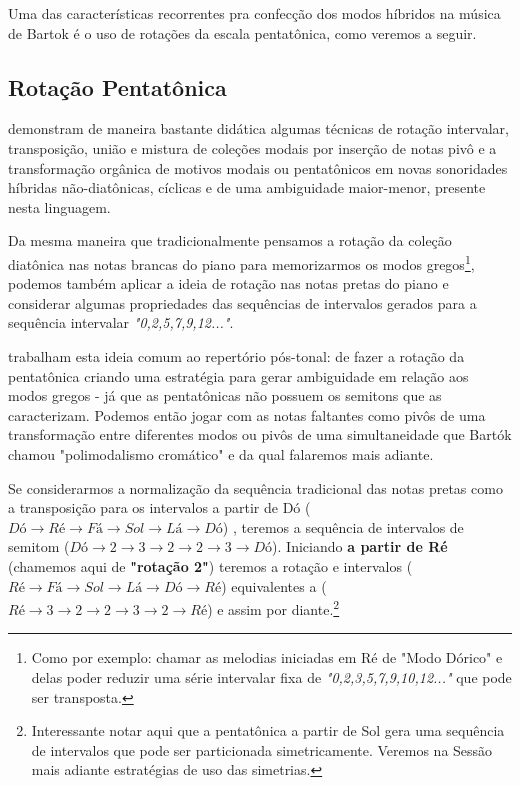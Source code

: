 \documentclass[
	12pt,				%
	openright,			%
	twoside,			%
	a4paper,			%
	english,			%
	french,				%
	spanish,			%
	brazil				%
	]{abntex2}
\begin{document}
Uma das características recorrentes pra confecção dos modos híbridos na música de Bartok é o uso de rotações da escala pentatônica, como veremos a seguir.


\subsection{Rotação Pentatônica}
\label{pentarota}
 
 demonstram de maneira bastante didática algumas técnicas de rotação intervalar, transposição, união e mistura de coleções modais por inserção de notas pivô e a transformação orgânica de motivos modais ou pentatônicos em novas sonoridades híbridas não-diatônicas, cíclicas e de uma ambiguidade maior-menor, presente nesta linguagem. 

Da mesma maneira que tradicionalmente pensamos a rotação da coleção diatônica nas notas brancas do piano para memorizarmos os modos gregos\footnote{Como por exemplo: chamar as melodias iniciadas em Ré de "Modo Dórico" e delas poder reduzir uma série intervalar fixa de \textit{"0,2,3,5,7,9,10,12..."} que pode ser transposta.}, podemos também aplicar a ideia de rotação nas notas pretas do piano e considerar algumas propriedades das sequências de intervalos gerados para a sequência intervalar \textit{"0,2,5,7,9,12..."}.

 trabalham esta ideia comum ao repertório pós-tonal: de fazer a rotação da pentatônica criando uma estratégia para gerar ambiguidade em relação aos modos gregos - já que as pentatônicas não possuem os semitons que as caracterizam. Podemos então jogar com as notas faltantes como pivôs de uma transformação entre diferentes modos ou pivôs de uma simultaneidade que Bartók chamou "polimodalismo cromático" e da qual falaremos mais adiante. 

Se considerarmos a normalização da sequência tradicional das notas pretas como a transposição para os intervalos a partir de Dó ($Dó \rightarrow  Ré \rightarrow Fá \rightarrow Sol \rightarrow Lá \rightarrow Dó $) , teremos a sequência de intervalos de semitom ($Dó \rightarrow 2 \rightarrow  3 \rightarrow 2 \rightarrow 2  \rightarrow 3 \rightarrow Dó $). Iniciando \textbf{a partir de Ré} (chamemos aqui de \textbf{"rotação 2"}) teremos a rotação e intervalos ($Ré \rightarrow Fá \rightarrow Sol \rightarrow Lá \rightarrow Dó \rightarrow Ré $) equivalentes a ($  Ré \rightarrow 3 \rightarrow  2 \rightarrow 2 \rightarrow 3  \rightarrow 2 \rightarrow Ré $) e assim por diante.\footnote{Interessante notar aqui que a pentatônica a partir de Sol gera uma sequência de intervalos que pode ser particionada simetricamente. Veremos na Sessão mais adiante estratégias de uso das simetrias.}
\end{document}
